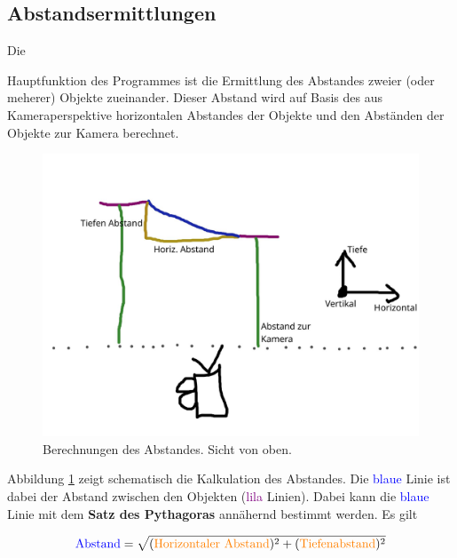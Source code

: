 \documentclass[12pt]{article}
\theoremstyle{definition}
\begin{document}
\subsection{Abstandsermittlungen}
\begin{flushleft}
\hypertarget{abst_erm}{Die} Hauptfunktion des Programmes ist die Ermittlung des Abstandes zweier (oder meherer) Objekte zueinander. Dieser Abstand wird auf Basis des aus Kameraperspektive horizontalen Abstandes der Objekte und den Abständen der Objekte zur Kamera berechnet.

\begin{figure}[h]
\centering
\includegraphics[scale=0.55]{Abstand_kalk}
\caption{Berechnungen des Abstandes. Sicht von oben.}
\label{fig:abstand_calc}
\end{figure}

Abbildung \ref{fig:abstand_calc} zeigt schematisch die Kalkulation des Abstandes. Die \textcolor{blue}{blaue} Linie ist dabei der Abstand zwischen den Objekten (\textcolor{purple}{lila} Linien). Dabei kann die \textcolor{blue}{blaue} Linie mit dem \textbf{Satz des Pythagoras} annähernd bestimmt werden. Es gilt

\begin{equation}
\text{\textcolor{blue}{Abstand}} = \sqrt{(\text{\textcolor{orange}{Horizontaler Abstand}})^2 + (\text{\textcolor{orange}{Tiefenabstand}})^2}
\end{equation}
\end{flushleft}
\end{document}
